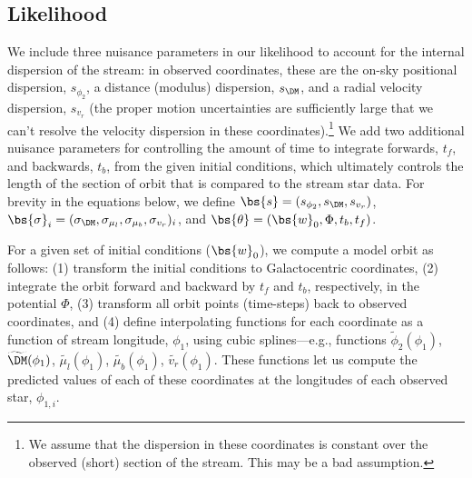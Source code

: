 \documentclass[letterpaper,12pt,preprint]{aastex}
\begin{document}
\subsection{Likelihood}

We include three nuisance parameters in our likelihood to account for the internal dispersion of the stream: in observed coordinates, these are the on-sky positional dispersion, $s_{\phi_2}$, a distance (modulus) dispersion, $s_{\DM}$, and a radial velocity dispersion, $s_{v_r}$ (the proper motion uncertainties are sufficiently large that we can't resolve the velocity dispersion in these coordinates).\footnote{We assume that the dispersion in these coordinates is constant over the observed (short) section of the stream. This may be a bad assumption.} We add two additional nuisance parameters for controlling the amount of time to integrate forwards, $t_f$, and backwards, $t_b$, from the given initial conditions, which ultimately controls the length of the section of orbit that is compared to the stream star data. For brevity in the equations below, we define $\bs{s} = (s_{\phi_2}, s_{\DM}, s_{v_r})$, $\bs{\sigma}_i = (\sigma_{\DM}, \sigma_{\mu_l}, \sigma_{\mu_b}, \sigma_{v_r})_i$, and $\bs{\theta} = (\bs{w}_0, \Phi, t_b, t_f)$.

For a given set of initial conditions ($\bs{w}_0$), we compute a model orbit as follows: (1) transform the initial conditions to Galactocentric coordinates, (2) integrate the orbit forward and backward by $t_f$ and $t_b$, respectively, in the potential $\Phi$, (3) transform all orbit points (time-steps) back to observed coordinates, and (4) define interpolating functions for each coordinate as a function of stream longitude, $\phi_1$, using cubic splines---e.g., functions $\widetilde{\phi}_{2}(\phi_1)$, $\widetilde{\DM}(\phi_1)$, $\widetilde{\mu_l}(\phi_1)$, $\widetilde{\mu_b}(\phi_1)$, $\widetilde{v_r}(\phi_1)$. These functions let us compute the predicted values of each of these coordinates at the longitudes of each observed star, $\phi_{1,i}$.
\end{document}
